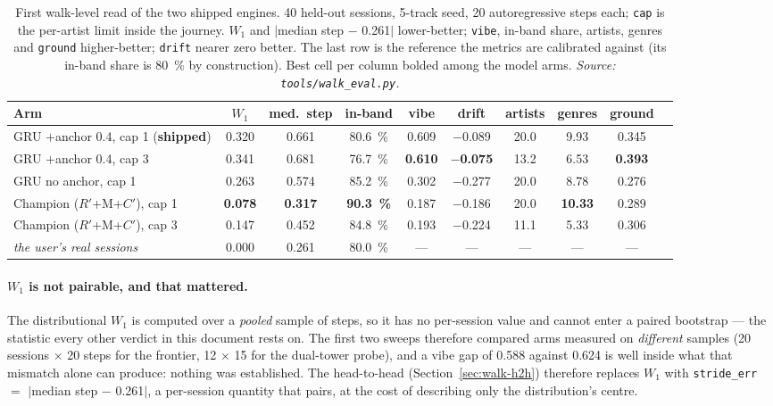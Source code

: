 \documentclass[11pt]{article}
\newcommand{\best}[1]{\textbf{#1}}
\newcommand{\Rp}{\ensuremath{R'}}
\newcommand{\Cp}{\ensuremath{C'}}
\begin{document}
\begin{table}[ht]
  \centering
  \caption{First walk-level read of the two shipped engines. \num{40} held-out
  sessions, 5-track seed, \num{20} autoregressive steps each; \texttt{cap} is the
  per-artist limit inside the journey. $W_1$ and $|$median step $-$ \num{0.261}$|$
  lower-better; \texttt{vibe}, in-band share, artists, genres and \texttt{ground}
  higher-better; \texttt{drift} nearer zero better. The last row is the reference
  the metrics are calibrated against (its in-band share is \SI{80}{\percent} by
  construction). Best cell per column bolded among the model arms.
  \emph{Source: \texttt{tools/walk\_eval.py}.}}
  \label{tab:walk-arms}
  {\footnotesize\setlength{\tabcolsep}{4pt}\begin{tabular}{lccccccccc}
    \toprule
    Arm & $W_1$ & med.\ step & in-band & vibe & drift & artists & genres & ground \\
    \midrule
    GRU $+$anchor \num{0.4}, cap 1 (\textbf{shipped}) & 0.320 & 0.661 & \SI{80.6}{\percent} & 0.609 & $-$0.089 & 20.0 & 9.93 & 0.345 \\
    GRU $+$anchor \num{0.4}, cap 3 & 0.341 & 0.681 & \SI{76.7}{\percent} & \best{0.610} & \best{$-$0.075} & 13.2 & 6.53 & \best{0.393} \\
    GRU no anchor, cap 1 & 0.263 & 0.574 & \SI{85.2}{\percent} & 0.302 & $-$0.277 & 20.0 & 8.78 & 0.276 \\
    Champion (\Rp+M+\Cp), cap 1 & \best{0.078} & \best{0.317} & \best{\SI{90.3}{\percent}} & 0.187 & $-$0.186 & 20.0 & \best{10.33} & 0.289 \\
    Champion (\Rp+M+\Cp), cap 3 & 0.147 & 0.452 & \SI{84.8}{\percent} & 0.193 & $-$0.224 & 11.1 & 5.33 & 0.306 \\
    \midrule
    \emph{the user's real sessions} & 0.000 & 0.261 & \SI{80.0}{\percent} & --- & --- & --- & --- & --- \\
    \bottomrule
  \end{tabular}}
\end{table}

\paragraph{$W_1$ is not pairable, and that mattered.} The distributional $W_1$ is
computed over a \emph{pooled} sample of steps, so it has no per-session value and
cannot enter a paired bootstrap --- the statistic every other verdict in this
document rests on. The first two sweeps therefore compared arms measured on
\emph{different} samples (20 sessions $\times$ 20 steps for the frontier, 12
$\times$ 15 for the dual-tower probe), and a vibe gap of \num{0.588} against
\num{0.624} is well inside what that mismatch alone can produce: nothing was
established. The head-to-head (Section~\ref{sec:walk-h2h}) therefore replaces
$W_1$ with \texttt{stride\_err} $=$ $|$median step $-$ \num{0.261}$|$, a
per-session quantity that pairs, at the cost of describing only the
distribution's centre.
\end{document}

